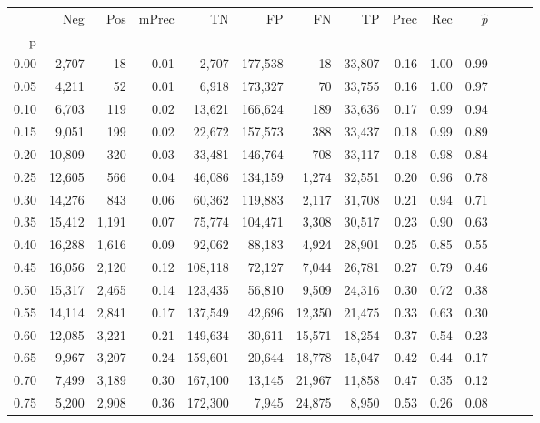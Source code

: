 \begin{tabular}{rrrrrrrrrrrrrr}
\toprule
{} &     Neg &    Pos & mPrec &       TN &       FP &      FN &      TP &  Prec &   Rec & $\hat{p}$ \\
p    &         &        &       &          &          &         &         &       &       &           \\
\midrule
0.00 &   2,707 &     18 &  0.01 &    2,707 &  177,538 &      18 &  33,807 &  0.16 &  1.00 &      0.99 \\
0.05 &   4,211 &     52 &  0.01 &    6,918 &  173,327 &      70 &  33,755 &  0.16 &  1.00 &      0.97 \\
0.10 &   6,703 &    119 &  0.02 &   13,621 &  166,624 &     189 &  33,636 &  0.17 &  0.99 &      0.94 \\
0.15 &   9,051 &    199 &  0.02 &   22,672 &  157,573 &     388 &  33,437 &  0.18 &  0.99 &      0.89 \\
0.20 &  10,809 &    320 &  0.03 &   33,481 &  146,764 &     708 &  33,117 &  0.18 &  0.98 &      0.84 \\
0.25 &  12,605 &    566 &  0.04 &   46,086 &  134,159 &   1,274 &  32,551 &  0.20 &  0.96 &      0.78 \\
0.30 &  14,276 &    843 &  0.06 &   60,362 &  119,883 &   2,117 &  31,708 &  0.21 &  0.94 &      0.71 \\
0.35 &  15,412 &  1,191 &  0.07 &   75,774 &  104,471 &   3,308 &  30,517 &  0.23 &  0.90 &      0.63 \\
0.40 &  16,288 &  1,616 &  0.09 &   92,062 &   88,183 &   4,924 &  28,901 &  0.25 &  0.85 &      0.55 \\
0.45 &  16,056 &  2,120 &  0.12 &  108,118 &   72,127 &   7,044 &  26,781 &  0.27 &  0.79 &      0.46 \\
0.50 &  15,317 &  2,465 &  0.14 &  123,435 &   56,810 &   9,509 &  24,316 &  0.30 &  0.72 &      0.38 \\
0.55 &  14,114 &  2,841 &  0.17 &  137,549 &   42,696 &  12,350 &  21,475 &  0.33 &  0.63 &      0.30 \\
0.60 &  12,085 &  3,221 &  0.21 &  149,634 &   30,611 &  15,571 &  18,254 &  0.37 &  0.54 &      0.23 \\
0.65 &   9,967 &  3,207 &  0.24 &  159,601 &   20,644 &  18,778 &  15,047 &  0.42 &  0.44 &      0.17 \\
0.70 &   7,499 &  3,189 &  0.30 &  167,100 &   13,145 &  21,967 &  11,858 &  0.47 &  0.35 &      0.12 \\
0.75 &   5,200 &  2,908 &  0.36 &  172,300 &    7,945 &  24,875 &   8,950 &  0.53 &  0.26 &      0.08 \\

\end{tabular}

